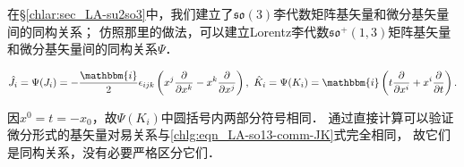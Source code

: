 在\S\ref{chlar:sec_LA-su2so3}中，我们建立了$\mathfrak{so}(3)$李代数矩阵基矢量和微分基矢量间的同构关系；
仿照那里的做法，可以建立Lorentz李代数$\mathfrak{so}^{+}(1,3)$矩阵基矢量和微分基矢量间的同构关系$\Psi$．
\begin{small}  %
\begin{equation}\label{chlg:eqn_LA-so13-JK-diff}
    \hat{J}_i=\Psi(J_i)= -\frac{\mathbbm{i}}{2}\epsilon_{ijk} \left(x^j\frac{\partial }{\partial x^k}
    - x^k\frac{\partial }{\partial x^j}\right), \ 
    \hat{K}_i=\Psi(K_i)= \mathbbm{i} \left(t\frac{\partial }{\partial x^i}+  x^i\frac{\partial }{\partial t}\right) .
\end{equation} %
\end{small}
因$x^0 = t=-x_0$，故$\Psi(K_i)$中圆括号内两部分符号相同．
通过直接计算可以验证微分形式的基矢量对易关系与\eqref{chlg:eqn_LA-so13-comm-JK}式完全相同，
故它们是同构关系，没有必要严格区分它们．




 

